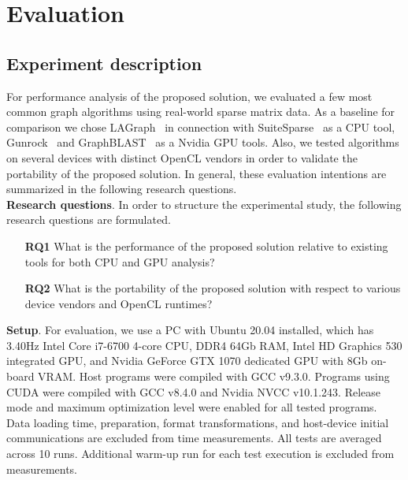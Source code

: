 \section{Evaluation}

\subsection{Experiment description}

For performance analysis of the proposed solution, we evaluated a few most common graph algorithms using real-world sparse matrix data. As a baseline for comparison we chose LAGraph~\cite{misc:la_graph} in connection with SuiteSparse~\cite{article:suite_sparse_for_graph_problems} as a CPU tool, Gunrock~\cite{article:gunrock} and GraphBLAST~\cite{yang2019graphblast} as a Nvidia GPU tools. Also, we tested algorithms on several devices with distinct OpenCL vendors in order to validate the portability of the proposed solution. In general, these evaluation intentions are summarized in the following research questions.\\

\textbf{Research questions}. In order to structure the experimental study, the following research questions are formulated.

\begin{itemize}
    \item[\textbf{RQ1}] What is the performance of the proposed solution relative to existing tools for both CPU and GPU analysis?
    
    \item[\textbf{RQ2}] What is the portability of the proposed solution with respect to various device vendors and OpenCL runtimes?
\end{itemize}

\textbf{Setup}. For evaluation, we use a PC with Ubuntu 20.04 installed, which has 3.40Hz Intel Core i7-6700 4-core CPU, DDR4 64Gb RAM, Intel HD Graphics 530 integrated GPU, and Nvidia GeForce GTX 1070 dedicated GPU with 8Gb on-board VRAM. Host programs were compiled with GCC v9.3.0. Programs using CUDA were compiled with GCC v8.4.0 and Nvidia NVCC v10.1.243. Release mode and maximum optimization level were enabled for all tested programs. Data loading time, preparation, format transformations, and host-device initial communications are excluded from time measurements. All tests are averaged across 10 runs. Additional warm-up run for each test execution is excluded from measurements.\\

